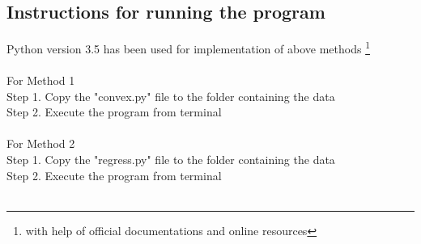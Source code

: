 \documentclass[a4paper,11pt]{article}
\newcommand\tab[1][1cm]{\hspace*{#1}}
\begin{document}
\begin{mlsolution}
\subsection*{Instructions for running the program } 

\tab Python version 3.5 has been used for implementation of above methods \footnote{ with help of official documentations and online resources}\\
\\
\noindent
\tab For Method 1\\
\tab \tab Step 1. Copy the "convex.py" file to the folder containing the data \\
\tab \tab Step 2. Execute the program from terminal\\
\\
\tab For Method 2\\
\tab \tab Step 1. Copy the "regress.py" file to the folder containing the data\\
\tab \tab Step 2. Execute the program from terminal\\
\\


\end{mlsolution}
\end{document}
